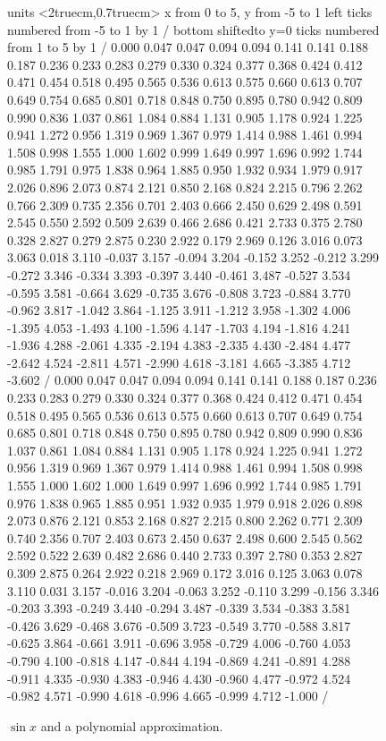 \begin{figure}[H]
\centerline{
\vbox{\beginpicture
\normalgraphs
\setcoordinatesystem units <2truecm,0.7truecm>
\setplotarea x from 0 to 5, y from -5 to 1
\axis left ticks numbered from -5 to 1 by 1 /
\axis bottom shiftedto y=0 ticks numbered from 1 to 5 by 1 /
\setquadratic
{} 0.000 0.047 0.047 0.094 0.094 0.141 0.141 0.188 0.187 
0.236 0.233 0.283 0.279 0.330 0.324 0.377 0.368 0.424 0.412 
0.471 0.454 0.518 0.495 0.565 0.536 0.613 0.575 0.660 0.613 
0.707 0.649 0.754 0.685 0.801 0.718 0.848 0.750 0.895 0.780 
0.942 0.809 0.990 0.836 1.037 0.861 1.084 0.884 1.131 0.905 
1.178 0.924 1.225 0.941 1.272 0.956 1.319 0.969 1.367 0.979 
1.414 0.988 1.461 0.994 1.508 0.998 1.555 1.000 1.602 0.999 
1.649 0.997 1.696 0.992 1.744 0.985 1.791 0.975 1.838 0.964 
1.885 0.950 1.932 0.934 1.979 0.917 2.026 0.896 2.073 0.874 
2.121 0.850 2.168 0.824 2.215 0.796 2.262 0.766 2.309 0.735 
2.356 0.701 2.403 0.666 2.450 0.629 2.498 0.591 2.545 0.550 
2.592 0.509 2.639 0.466 2.686 0.421 2.733 0.375 2.780 0.328 
2.827 0.279 2.875 0.230 2.922 0.179 2.969 0.126 3.016 0.073 
3.063 0.018 3.110 -0.037 3.157 -0.094 3.204 -0.152 3.252 -0.212 
3.299 -0.272 3.346 -0.334 3.393 -0.397 3.440 -0.461 3.487 -0.527 
3.534 -0.595 3.581 -0.664 3.629 -0.735 3.676 -0.808 3.723 -0.884 
3.770 -0.962 3.817 -1.042 3.864 -1.125 3.911 -1.212 3.958 -1.302 
4.006 -1.395 4.053 -1.493 4.100 -1.596 4.147 -1.703 4.194 -1.816 
4.241 -1.936 4.288 -2.061 4.335 -2.194 4.383 -2.335 4.430 -2.484 
4.477 -2.642 4.524 -2.811 4.571 -2.990 4.618 -3.181 4.665 -3.385 
4.712 -3.602 /
 0.000 0.047 0.047 0.094 0.094 0.141 0.141 0.188 0.187 
0.236 0.233 0.283 0.279 0.330 0.324 0.377 0.368 0.424 0.412 
0.471 0.454 0.518 0.495 0.565 0.536 0.613 0.575 0.660 0.613 
0.707 0.649 0.754 0.685 0.801 0.718 0.848 0.750 0.895 0.780 
0.942 0.809 0.990 0.836 1.037 0.861 1.084 0.884 1.131 0.905 
1.178 0.924 1.225 0.941 1.272 0.956 1.319 0.969 1.367 0.979 
1.414 0.988 1.461 0.994 1.508 0.998 1.555 1.000 1.602 1.000 
1.649 0.997 1.696 0.992 1.744 0.985 1.791 0.976 1.838 0.965 
1.885 0.951 1.932 0.935 1.979 0.918 2.026 0.898 2.073 0.876 
2.121 0.853 2.168 0.827 2.215 0.800 2.262 0.771 2.309 0.740 
2.356 0.707 2.403 0.673 2.450 0.637 2.498 0.600 2.545 0.562 
2.592 0.522 2.639 0.482 2.686 0.440 2.733 0.397 2.780 0.353 
2.827 0.309 2.875 0.264 2.922 0.218 2.969 0.172 3.016 0.125 
3.063 0.078 3.110 0.031 3.157 -0.016 3.204 -0.063 3.252 -0.110 
3.299 -0.156 3.346 -0.203 3.393 -0.249 3.440 -0.294 3.487 -0.339 
3.534 -0.383 3.581 -0.426 3.629 -0.468 3.676 -0.509 3.723 -0.549 
3.770 -0.588 3.817 -0.625 3.864 -0.661 3.911 -0.696 3.958 -0.729 
4.006 -0.760 4.053 -0.790 4.100 -0.818 4.147 -0.844 4.194 -0.869 
4.241 -0.891 4.288 -0.911 4.335 -0.930 4.383 -0.946 4.430 -0.960 
4.477 -0.972 4.524 -0.982 4.571 -0.990 4.618 -0.996 4.665 -0.999 
4.712 -1.000 /
\endpicture}}
\caption{$\sin x$ and a polynomial approximation.}
\label{fig:sine approximation}
\end{figure}

